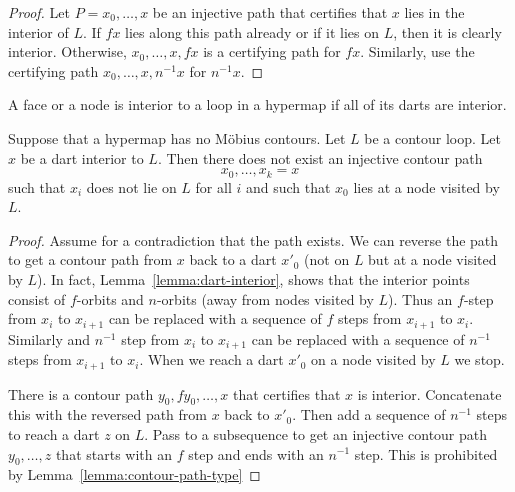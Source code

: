 \begin{proof} Let $P= x_0,\ldots,x$ be an injective path that certifies that $x$ lies
in the interior of $L$.  If $f x$ lies along this path already or if it lies on $L$,
then it is clearly interior.  Otherwise, $x_0,\ldots,x,f x$ is a certifying path
for $f x$.  Similarly, use the certifying path $x_0,\ldots,x,n^{-1} x$ for $n^{-1} x$.
\end{proof}


\begin{definition}  A face or a node is interior to a
loop in a hypermap if all of its darts are interior.
\end{definition}

\begin{lemma}
Suppose that a hypermap has no M\"obius contours.  Let $L$ be a contour loop.
Let $x$ be a dart interior to $L$.  Then there does not exist an injective contour path
$$x_0,\ldots,x_k=x$$
such that $x_i$ does not lie on $L$ for all $i$ and such that $x_0$ lies at a node
visited by $L$.
\end{lemma}

\begin{proof} Assume for a contradiction that the path exists. 
We can reverse the path to get a contour path from $x$ back to a dart $x'_0$ (not on $L$ but at a node
visited by $L$).  In fact, Lemma~\ref{lemma:dart-interior}, shows that the interior points consist of $f$-orbits
and $n$-orbits (away from nodes visited by $L$).  Thus an $f$-step from $x_i$ to $x_{i+1}$ can be replaced
with a sequence of $f$ steps from $x_{i+1}$ to $x_i$.  Similarly and $n^{-1}$ step from $x_i$ to $x_{i+1}$
can be replaced with a sequence of $n^{-1}$ steps from $x_{i+1}$ to $x_i$.  When we reach a dart $x'_0$ on a node
visited by $L$ we stop.  

There is a contour path $y_0,f y_0,\ldots,x$ that certifies that $x$ is interior.  Concatenate this
with the reversed path from $x$ back to $x'_0$.  Then add a sequence of $n^{-1}$ steps to reach a dart $z$
on $L$.  Pass to a subsequence to get an injective contour path $y_0,\ldots,z$ that starts with an $f$ step
and ends with an $n^{-1}$ step.  This is prohibited by Lemma~\ref{lemma:contour-path-type} 
\end{proof}


